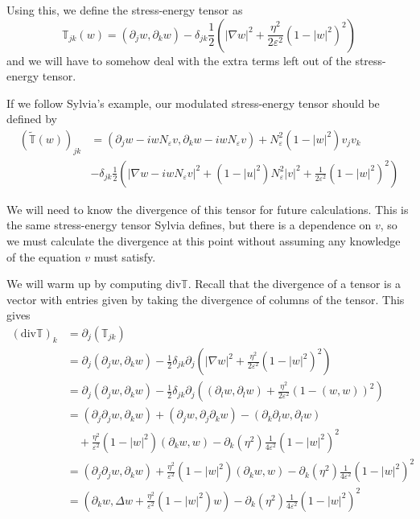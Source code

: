 \documentclass[a4paper]{article}
\renewcommand{\div}{\mathrm{div}}
\begin{document}
Using this, we define the stress-energy tensor as
\begin{equation} \label{eqn:stress_energy}
  \mathbb{T}_{jk}(w) = (\partial_j w, \partial_k w) - \delta_{jk} \frac{1}{2} \left( |\nabla w|^2 + \frac{\eta^2}{2 \varepsilon^2} (1-|w|^2)^2 \right)
\end{equation}
and we will have to somehow deal with the extra terms left out of the stress-energy tensor.

If we follow Sylvia's example, our modulated stress-energy tensor should be defined by
\begin{align} \label{eqn:mod_stress_energy}
  (\tilde{\mathbb{T}}(w))_{jk} &= (\partial_j w- i w N_\varepsilon v, \partial_k w - i w N_\varepsilon v) + N_\varepsilon^2 (1 - |w|^2) v_j v_k
  \nonumber \\
  &- \delta_{jk} \frac{1}{2} \left( |\nabla w - i w N_\varepsilon v|^2 + (1-|u|^2) N_\varepsilon^2 |v|^2 + \frac{1}{2 \varepsilon^2} (1 - |w|^2)^2
  \right)
\end{align}

We will need to know the divergence of this tensor for future calculations. This is the same stress-energy tensor Sylvia defines, but there is a
dependence on $v$, so we must calculate the divergence at this point without assuming any knowledge of the equation $v$ must satisfy.

We will warm up by computing $\div \mathbb{T}$. Recall that the divergence of a tensor is a vector with entries given by taking the divergence of
columns of the tensor. This gives
\begin{align}
  (\div \mathbb{T})_k &= \partial_j (\mathbb{T}_{jk}) \nonumber \\
  &= \partial_j (\partial_j w, \partial_k w) - \frac{1}{2} \delta_{jk} \partial_j \left( |\nabla w|^2 + \frac{\eta^2}{2 \varepsilon^2} (1-|w|^2)^2
  \right) \nonumber \\
  &= \partial_j (\partial_j w, \partial_k w) - \frac{1}{2} \delta_{jk} \partial_j \left( (\partial_l w, \partial_l w) + \frac{\eta^2}{2 \varepsilon^2}
  (1 - (w,w))^2 \right) \nonumber \\
  &= (\partial_j \partial_j w, \partial_k w) + (\partial_j w, \partial_j \partial_k w) - (\partial_k \partial_l w, \partial_l w) \nonumber \\
  &\quad + \frac{\eta^2}{\varepsilon^2} (1 - |w|^2) (\partial_k w, w) - \partial_k (\eta^2) \frac{1}{4 \varepsilon^2} (1 - |w|^2)^2 \nonumber \\
  &= (\partial_j \partial_j w, \partial_k w) + \frac{\eta^2}{\varepsilon^2} (1 - |w|^2) (\partial_k w, w) - \partial_k(\eta^2) \frac{1}{4
  \varepsilon^2} (1 - |w|^2)^2 \nonumber \\
  &= (\partial_k w, \Delta w + \frac{\eta^2}{\varepsilon^2} (1 - |w|^2)w) - \partial_k(\eta^2) \frac{1}{4\varepsilon^2} (1 - |w|^2)^2
  \label{eqn:div_stress_energy_comp}
\end{align}
\end{document}
